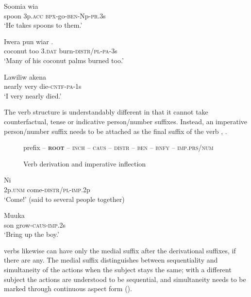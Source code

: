 \ea%
\label{ex:3:x180} 
\gll Soomia wia  \\
spoon 3p.\textsc{acc} \textsc{bpx}-go-\textsc{ben}-Np-\textsc{pr}.3s\\
\glt`He takes spoons to them.'
\z

\ea%
\label{ex:3:x181}
\gll Iwera pun wiar . \\
coconut too 3.\textsc{dat} burn-\textsc{distr}/\textsc{pl}-\textsc{pa}-3s\\
\glt`Many of his coconut palms burned too.'
\z

\ea%
\label{ex:3:x182}
\gll Lawiliw akena  \\
nearly very die-\textsc{cntf}-\textsc{pa}-1s \\
\glt`I very nearly died.'
\z

The  verb structure  is understandably different in that it cannot take counterfactual, tense or indicative person/number suffixes. Instead, an imperative person/number suffix needs to be attached as the final suffix of the verb , .
%
%
\begin{figure}
prefix --  \textbf{\textsc{root}} -- \textsc{inch} -- \textsc{caus} -- \textsc{distr} -- \textsc{ben} -- \textsc{bnfy} -- \textsc{imp.prs/num}
\caption{Verb derivation and imperative inflection}\label{fig:3:imperativeinflection}
\end{figure}

\ea%
\label{ex:3:x183}
\gll Ni  \\
2p.\textsc{unm} come-\textsc{distr}/\textsc{pl}-\textsc{imp}.2p\\
\glt`Come!' (said to several people together) 
\z

\ea%
\label{ex:3:x184}
\gll Muuka  \\
son grow-\textsc{caus}-\textsc{imp}.2s \\
\glt`Bring up the boy.' 
\z

 verbs likewise can have only the medial suffix after the derivational suffixes, if there are any. The medial suffix distinguishes between sequentiality  and simultaneity  of the actions when the subject stays the same; with a different subject  the actions are understood to be sequential, and simultaneity needs to be marked through continuous aspect form ().

